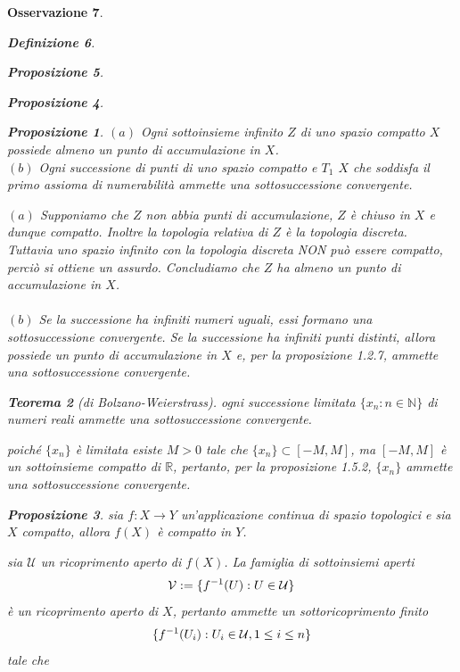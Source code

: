 \documentclass[oneside, 11pt]{amsbook}
\makeatletter
\newcommand{\0}{{(0)}}
\newcommand{\3}{{(3)}}
\theoremstyle{colonplain}
\newtheorem{thm}{Teorema}[chapter]
\newtheorem{prop}[thm]{Proposizione}
\theoremstyle{colondefinition}
\newtheorem{defn}[thm]{Definizione}
\theoremstyle{colonremark}
\newtheorem{rmk}[thm]{Osservazione}
\numberwithin{equation}{chapter}
\renewcommand{\proofname}{Dimostrazione}
\renewenvironment{proof}[1][\proofname]{\par
  \pushQED{\end{proof}}%
  \normalfont \topsep6\p@\@plus6\p@\relax
  \trivlist
  \item[\hskip\labelsep\bfseries #1:]\ignorespaces
}{%
  \popQED\endtrivlist\@endpefalse
}
\makeatother
\begin{document}
\begin{rmk}
\begin{defn}
\begin{prop}
\begin{prop}
\begin{prop}
$(a)$ Ogni sottoinsieme infinito $Z$ di uno spazio compatto $X$ possiede almeno un punto di accumulazione in $X$. \\
$(b)$ Ogni successione di punti di uno spazio compatto e $T_1$ $X$ che soddisfa il primo assioma di numerabilità ammette una sottosuccessione convergente.
\end{prop}
\begin{proof}
$(a)$ Supponiamo che $Z$ non abbia punti di accumulazione, $Z$ è chiuso in $X$ e dunque compatto. Inoltre la topologia relativa di $Z$ è la topologia discreta. Tuttavia uno spazio infinito con la topologia discreta NON può essere compatto, perciò si ottiene un assurdo. Concludiamo che $Z$ ha almeno un punto di accumulazione in $X$. \\ \\
$(b)$ Se la successione ha infiniti numeri uguali, essi formano una sottosuccessione convergente. Se la successione ha infiniti punti distinti, allora possiede un punto di accumulazione in $X$ e, per la \textit{proposizione 1.2.7}, ammette una sottosuccessione convergente.
\end{proof}
\begin{thm}[di Bolzano-Weierstrass]
ogni successione limitata $\{ x_n : n \in \mathbb{N} \}$ di numeri reali ammette una sottosuccessione convergente.
\end{thm}
\begin{proof}
poiché $\{ x_n \}$ è limitata esiste $M > 0$ tale che $\{ x_n \} \subset [-M, M]$, ma $[-M, M]$ è un sottoinsieme compatto di $\mathbb{R}$, pertanto, per la \textit{proposizione 1.5.2}, $\{ x_n \}$ ammette una sottosuccessione convergente.
\end{proof}
\begin{prop}
sia $f : X \longrightarrow Y$ un'applicazione continua di spazio topologici e sia $X$ compatto, allora $f(X)$ è compatto in $Y$.
\end{prop}
\begin{proof}
sia $\mathcal{U}$ un ricoprimento aperto di $f(X)$. La famiglia di sottoinsiemi aperti
\begin{align}
    \mathcal{V} := \{ f^{-1}(U) : U \in \mathcal{U} \} \notag
\end{align}
è un ricoprimento aperto di $X$, pertanto ammette un sottoricoprimento finito
\begin{align}
    \{ f^{-1}(U_i) : U_i \in \mathcal{U}, 1 \leq i \leq n \} \notag
\end{align}
tale che
\begin{align}

\end{align}
\end{proof}
\end{prop}
\end{prop}
\end{defn}
\end{rmk}
\end{document}
